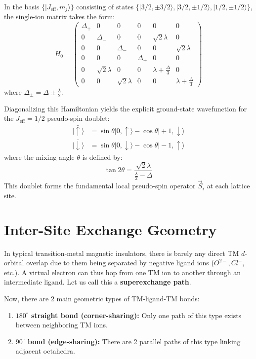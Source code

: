 \documentclass[11pt,a4paper]{article}
\begin{document}
In the basis $\{ |J_{\text{eff}}, m_j\rangle \}$ consisting of states $\{ |3/2, \pm 3/2\rangle, |3/2, \pm 1/2\rangle, |1/2, \pm 1/2\rangle \}$, the single-ion matrix takes the form:
\begin{equation}
    H_0 = \begin{pmatrix}
        \Delta_+ & 0 & 0 & 0 & 0 & 0 \\
        0 & \Delta_- & 0 & 0 & \sqrt{2}\lambda & 0 \\
        0 & 0 & \Delta_- & 0 & 0 & \sqrt{2}\lambda \\
        0 & 0 & 0 & \Delta_+ & 0 & 0 \\
        0 & \sqrt{2}\lambda & 0 & 0 & \lambda + \frac{\Delta}{3} & 0 \\
        0 & 0 & \sqrt{2}\lambda & 0 & 0 & \lambda + \frac{\Delta}{3}
    \end{pmatrix}
\end{equation}
where $\Delta_{\pm} = \Delta \pm \frac{\lambda}{2}$.

Diagonalizing this Hamiltonian yields the explicit ground-state wavefunction for the $J_{\text{eff}} = 1/2$ pseudo-spin doublet:
\begin{align}
    |\bar{\uparrow}\rangle &= \sin\theta |0, \uparrow\rangle - \cos\theta |+1, \downarrow\rangle \\
    |\bar{\downarrow}\rangle &= \sin\theta |0, \downarrow\rangle - \cos\theta |-1, \uparrow\rangle
\end{align}
where the mixing angle $\theta$ is defined by:
\begin{equation}
    \tan 2\theta = \frac{\sqrt{2}\lambda}{\frac{\lambda}{2} - \Delta}
\end{equation}
This doublet forms the fundamental local pseudo-spin operator $\vec{S}_{i}$ at each lattice site.

\section{Inter-Site Exchange Geometry}

In typical transition-metal magnetic insulators, there is barely any direct TM $d$-orbital overlap due to them being separated by negative ligand ions ($O^{2-}, Cl^{-}$, etc.). A virtual electron can thus hop from one TM ion to another through an intermediate ligand. Let us call this a \textbf{superexchange path}.

Now, there are 2 main geometric types of TM-ligand-TM bonds:
\begin{enumerate}
    \item \textbf{$180^\circ$ straight bond (corner-sharing):} Only one path of this type exists between neighboring TM ions.
    \item \textbf{$90^\circ$ bond (edge-sharing):} There are 2 parallel paths of this type linking adjacent octahedra.
\end{enumerate}
\end{document}
